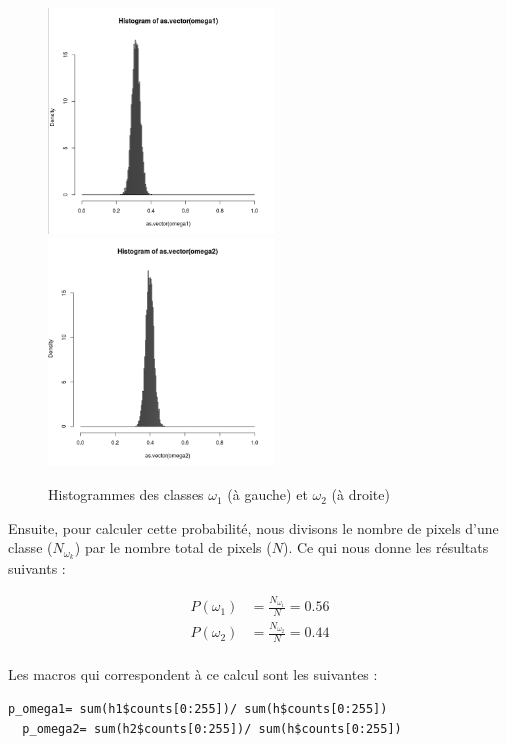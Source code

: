 \documentclass[a4paper,11pt]{article}
\begin{document}
  \begin{figure}[H]
    \center
    \includegraphics[width=6cm]{resultat/hist_omega1.png}
    \includegraphics[width=6cm]{resultat/hist_omega2.png}
    \caption{Histogrammes des classes $\omega_{1}$ (à gauche) et $\omega_{2}$ (à droite)}
  \end{figure}
  
  Ensuite, pour calculer cette probabilité, nous divisons le nombre de pixels d'une classe ($N_{\omega_k}$) par
  le nombre total de pixels ($N$). Ce qui nous donne les résultats suivants :
  
  \begin{align*}
    P(\omega_{1}) &= \frac{ N_{\omega_{1}} }{ N } = 0.56 \\
    P(\omega_{2}) &= \frac{ N_{\omega_{2}} }{ N } = 0.44 \\
  \end{align*}
  
  Les macros qui correspondent à ce calcul sont les suivantes :\\
  
  \begin{lstlisting}[caption=Macros de calcule de probabilité à priori des classe $N_{w_1}$ et $N_{w_2}$]
  p_omega1= sum(h1$counts[0:255])/ sum(h$counts[0:255])
  p_omega2= sum(h2$counts[0:255])/ sum(h$counts[0:255])\end{lstlisting}
  
\end{document}
